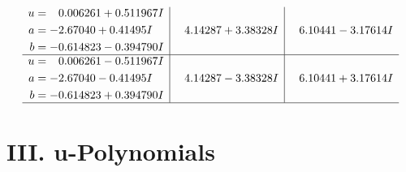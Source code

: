 \documentclass[1p]{elsarticle_modified}
\theoremstyle{definition}
\begin{document}
$$\begin{array}{c|c|c}
\begin{aligned}
u &= \phantom{-}0.006261 + 0.511967 I \\
a &= -2.67040 + 0.41495 I \\
b &= -0.614823 - 0.394790 I\end{aligned}
 & \phantom{-}4.14287 + 3.38328 I & \phantom{-}6.10441 - 3.17614 I \\ \hline\begin{aligned}
u &= \phantom{-}0.006261 - 0.511967 I \\
a &= -2.67040 - 0.41495 I \\
b &= -0.614823 + 0.394790 I\end{aligned}
 & \phantom{-}4.14287 - 3.38328 I & \phantom{-}6.10441 + 3.17614 I\\
 \hline 
 \end{array}$$\newpage
\newpage\renewcommand{\arraystretch}{1}
\centering \section*{ III. u-Polynomials}
\end{document}
